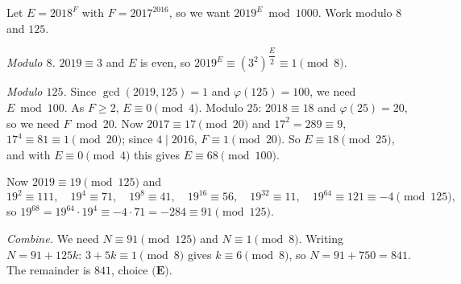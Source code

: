 Let $E=2018^{F}$ with $F=2017^{2016}$, so we want $2019^E \bmod 1000$. Work modulo $8$ and $125$.

\emph{Modulo $8$.} $2019\equiv3$ and $E$ is even, so $2019^E\equiv\left(3^2\right)^{\dfrac {E}{2}}\equiv1\pmod 8$.

\emph{Modulo $125$.} Since $\gcd(2019,125)=1$ and $\varphi(125)=100$, we need $E\bmod100$. As $F\ge2$, $E\equiv0\pmod4$. Modulo $25$: $2018\equiv18$ and $\varphi(25)=20$, so we need $F\bmod20$. Now $2017\equiv17\pmod{20}$ and $17^2=289\equiv9$, $17^4\equiv81\equiv1\pmod{20}$; since $4\mid2016$, $F\equiv1\pmod{20}$. So $E\equiv18\pmod{25}$, and with $E\equiv0\pmod4$ this gives $E\equiv68\pmod{100}$.

Now $2019\equiv19\pmod{125}$ and
\[
19^2\equiv111,\quad 19^4\equiv71,\quad 19^8\equiv41,\quad 19^{16}\equiv56,\quad 19^{32}\equiv11,\quad 19^{64}\equiv121\equiv-4\pmod{125},
\]
so $19^{68}=19^{64}\cdot19^4\equiv-4\cdot71=-284\equiv91\pmod{125}$.

\emph{Combine.} We need $N\equiv91\pmod{125}$ and $N\equiv1\pmod 8$. Writing $N=91+125k$: $3+5k\equiv1\pmod8$ gives $k\equiv6\pmod 8$, so $N=91+750=841$. The remainder is $\boxed{841}$, choice $\textbf{(E)}$.
